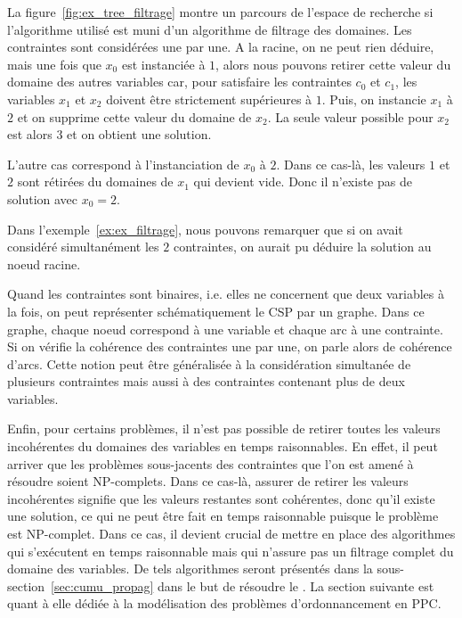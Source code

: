 \begin{ex}
La figure~\ref{fig:ex_tree_filtrage} montre un parcours de l'espace de
recherche si l'algorithme utilisé est muni d'un algorithme de filtrage
des domaines. Les contraintes sont considérées une par une.  A
la racine, on ne peut rien déduire, mais une fois que $x_0$ est
instanciée à $1$, alors nous pouvons retirer cette valeur du domaine
des autres variables car, pour satisfaire les contraintes $c_0$ et
$c_1$, les variables $x_1$ et $x_2$ doivent être strictement
supérieures à $1$. Puis, on instancie $x_1$ à $2$ et on supprime cette
valeur du domaine de $x_2$. La seule valeur possible pour $x_2$ est
alors $3$ et on obtient une solution.

L'autre cas correspond à l'instanciation de $x_0$ à $2$. Dans ce
cas-là, les valeurs $1$ et $2$ sont rétirées du domaines de $x_1$ qui
devient vide. Donc il n'existe pas de solution avec $x_0=2$.
\end{ex}

Dans l'exemple~\ref{ex:ex_filtrage}, nous pouvons remarquer que si on
avait considéré simultanément les $2$ contraintes, on
aurait pu déduire la solution au noeud racine. 

Quand les contraintes sont binaires, i.e. elles ne concernent que deux
variables à la fois, on peut représenter schématiquement le CSP par un
graphe. Dans ce graphe, chaque noeud correspond à une variable et
chaque arc à une contrainte. Si on vérifie la cohérence des
contraintes une par une, on parle alors de cohérence d'arcs. Cette
notion peut être généralisée à la considération simultanée de
plusieurs contraintes mais aussi à des contraintes contenant plus de
deux variables.

Enfin, pour certains problèmes, il n'est pas possible de retirer
toutes les valeurs incohérentes du domaines des variables en temps
raisonnables. En effet, il peut arriver que les problèmes sous-jacents
des contraintes que l'on est amené à résoudre soient NP-complets. Dans
ce cas-là, assurer de retirer les valeurs incohérentes signifie que
les valeurs restantes sont cohérentes, donc qu'il existe une
solution, ce qui ne peut être fait en temps raisonnable puisque le
problème est NP-complet.  Dans ce cas, il devient crucial de mettre
en place des algorithmes qui s'exécutent en temps raisonnable mais qui
n'assure pas un filtrage complet du domaine des variables. De tels
algorithmes seront présentés dans la sous-section~\ref{sec:cumu_propag}
dans le but de résoudre le \CUSP. La section suivante est quant à
elle dédiée à la modélisation des problèmes d'ordonnancement en PPC.